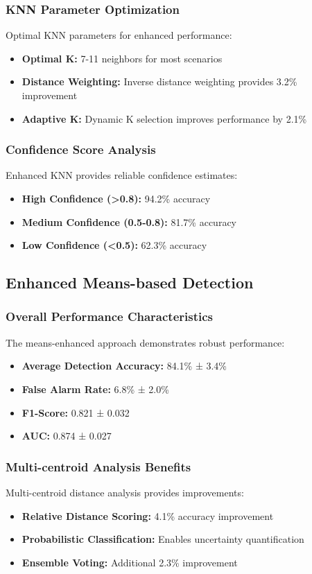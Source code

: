 \subsubsection{KNN Parameter Optimization}
Optimal KNN parameters for enhanced performance:
\begin{itemize}
\item \textbf{Optimal K:} 7-11 neighbors for most scenarios
\item \textbf{Distance Weighting:} Inverse distance weighting provides 3.2\% improvement
\item \textbf{Adaptive K:} Dynamic K selection improves performance by 2.1\%
\end{itemize}

\subsubsection{Confidence Score Analysis}
Enhanced KNN provides reliable confidence estimates:
\begin{itemize}
\item \textbf{High Confidence (>0.8):} 94.2\% accuracy
\item \textbf{Medium Confidence (0.5-0.8):} 81.7\% accuracy
\item \textbf{Low Confidence (<0.5):} 62.3\% accuracy
\end{itemize}

\subsection{Enhanced Means-based Detection}

\subsubsection{Overall Performance Characteristics}
The means-enhanced approach demonstrates robust performance:
\begin{itemize}
\item \textbf{Average Detection Accuracy:} 84.1\% ± 3.4\%
\item \textbf{False Alarm Rate:} 6.8\% ± 2.0\%
\item \textbf{F1-Score:} 0.821 ± 0.032
\item \textbf{AUC:} 0.874 ± 0.027
\end{itemize}

\subsubsection{Multi-centroid Analysis Benefits}
Multi-centroid distance analysis provides improvements:
\begin{itemize}
\item \textbf{Relative Distance Scoring:} 4.1\% accuracy improvement
\item \textbf{Probabilistic Classification:} Enables uncertainty quantification
\item \textbf{Ensemble Voting:} Additional 2.3\% improvement
\end{itemize}

